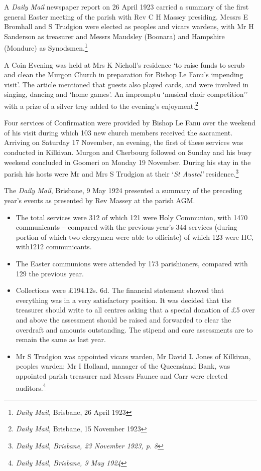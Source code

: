 A \emph{Daily Mail} newspaper report on 26 April 1923 carried a summary
of the first general Easter meeting of the parish with Rev C H Massey
presiding. Messrs E Bromhall and S Trudgion were elected as peoples and
vicars wardens, with Mr H Sanderson as treasurer and Messrs Maudsley
(Boonara) and Hampshire (Mondure) as Synodsmen.\footnote{\emph{Daily
  Mail,} Brisbane, 26 April 1923}

A Coin Evening was held at Mrs K Nicholl's residence `to raise funds to
scrub and clean the Murgon Church in preparation for Bishop Le Fanu's
impending visit'. The article mentioned that guests also played cards,
and were involved in singing, dancing and `home games'. An impromptu
`musical choir competition'' with a prize of a silver tray added to the
evening's enjoyment.\footnote{\emph{Daily Mail,} Brisbane, 15 November
  1923}

Four services of Confirmation were provided by Bishop Le Fanu over the
weekend of his visit during which 103 new church members received the
sacrament. Arriving on Saturday 17 November, an evening, the first of
these services was conducted in Kilkivan. Murgon and Cherbourg followed
on Sunday and his busy weekend concluded in Goomeri on Monday 19
November. During his stay in the parish his hosts were Mr and Mrs S
Trudgion at their `\emph{St Austel'} residence.\footnote{\emph{Daily
  Mail, Brisbane, 23 November 1923, p. 8}}

The \emph{Daily Mail}, Brisbane, 9 May 1924 presented a summary of the
preceding year's events as presented by Rev Massey at the parish AGM.

\begin{itemize}
\item
  The total services were 312 of which 121 were Holy Communion, with
  1470 communicants -- compared with the previous year's 344 services
  (during portion of which two clergymen were able to officiate) of
  which 123 were HC, with1212 communicants.
\item
  The Easter communions were attended by 173 parishioners, compared with
  129 the previous year.
\item
  Collections were \pounds194.12s. 6d. The financial statement showed that
  everything was in a very satisfactory position. It was decided that
  the treasurer should write to all centres asking that a special
  donation of \pounds5 over and above the assessment should be raised and
  forwarded to clear the overdraft and amounts outstanding. The stipend
  and care assessments are to remain the same as last year.
\item
  Mr S Trudgion was appointed vicars warden, Mr David L Jones of
  Kilkivan, peoples warden; Mr I Holland, manager of the Queensland
  Bank, was appointed parish treasurer and Messrs Faunce and Carr were
  elected auditors.\footnote{\emph{Daily Mail, Brisbane, 9 May 1924}}
\end{itemize}

